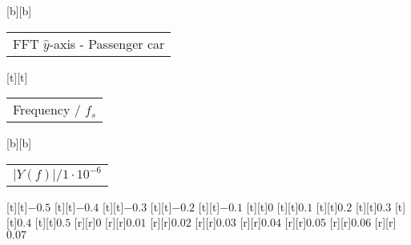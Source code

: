 %
[b][b]{\fontsize{8}{12}\selectfont \setlength{\tabcolsep}{0pt}\begin{tabular}{c}FFT $\hat{y}$-axis - Passenger car\end{tabular}}%
[t][t]{\fontsize{8}{12}\selectfont \setlength{\tabcolsep}{0pt}\begin{tabular}{c}Frequency / $f_s$\end{tabular}}%
[b][b]{\fontsize{8}{12}\selectfont \setlength{\tabcolsep}{0pt}\begin{tabular}{c}$\vert{}Y(f)\vert{}/1\cdot{}10^{-6}$\end{tabular}}%
%
\fontsize{6}{8}%
\selectfont%
%
[t][t]{$-0.5$}%
[t][t]{$-0.4$}%
[t][t]{$-0.3$}%
[t][t]{$-0.2$}%
[t][t]{$-0.1$}%
[t][t]{$0$}%
[t][t]{$0.1$}%
[t][t]{$0.2$}%
[t][t]{$0.3$}%
[t][t]{$0.4$}%
[t][t]{$0.5$}%
%
[r][r]{$0$}%
[r][r]{$0.01$}%
[r][r]{$0.02$}%
[r][r]{$0.03$}%
[r][r]{$0.04$}%
[r][r]{$0.05$}%
[r][r]{$0.06$}%
[r][r]{$0.07$}%
%
%
